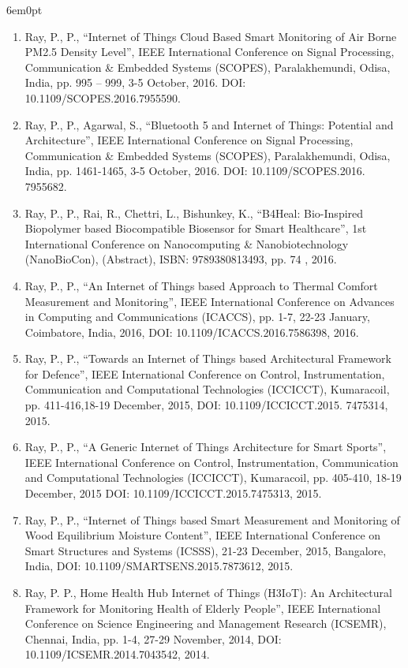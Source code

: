\documentclass[11pt,a4paper]{moderncv}
\begin{document}
\begin{adjustwidth}{6em}{0pt}
\begin{enumerate}
	\item Ray, P., P., “Internet of Things Cloud Based Smart Monitoring of Air Borne PM2.5 Density Level”, IEEE International Conference on Signal Processing, Communication \& Embedded Systems (SCOPES), Paralakhemundi, Odisa, India, pp. 995 – 999, 3-5 October, 2016. DOI: 10.1109/SCOPES.2016.7955590.
	
	\item Ray, P., P., Agarwal, S., “Bluetooth 5 and Internet of Things: Potential and Architecture”, IEEE International Conference on Signal Processing, Communication \& Embedded Systems (SCOPES), Paralakhemundi, Odisa, India, pp. 1461-1465, 3-5 October, 2016. DOI: 10.1109/SCOPES.2016. 7955682.
	
	\item Ray, P., P., Rai, R., Chettri, L., Bishunkey, K., “B4Heal: Bio-Inspired Biopolymer based Biocompatible Biosensor for Smart Healthcare”, 1st International Conference on Nanocomputing \& Nanobiotechnology (NanoBioCon), (Abstract), ISBN: 9789380813493, pp. 74 , 2016.
	
	\item Ray, P., P., “An Internet of Things based Approach to Thermal Comfort Measurement and Monitoring”, IEEE International Conference on Advances in Computing and Communications (ICACCS), pp. 1-7, 22-23 January, Coimbatore, India, 2016, DOI: 10.1109/ICACCS.2016.7586398, 2016.
	
	\item Ray, P., P., “Towards an Internet of Things based Architectural Framework for Defence”, IEEE International Conference on Control, Instrumentation, Communication and Computational Technologies (ICCICCT), Kumaracoil, pp. 411-416,18-19 December, 2015, DOI: 10.1109/ICCICCT.2015. 7475314, 2015.
	
	\item Ray, P., P., “A Generic Internet of Things Architecture for Smart Sports”, IEEE International Conference on Control, Instrumentation, Communication and Computational Technologies (ICCICCT), Kumaracoil, pp. 405-410, 18-19 December, 2015 DOI: 10.1109/ICCICCT.2015.7475313, 2015.
	
	\item Ray, P., P., “Internet of Things based Smart Measurement and Monitoring of Wood Equilibrium Moisture Content”, IEEE International Conference on Smart Structures and Systems (ICSSS), 21-23 December, 2015, Bangalore, India, DOI: 10.1109/SMARTSENS.2015.7873612, 2015.
	
	\item Ray, P. P., Home Health Hub Internet of Things (H3IoT): An Architectural Framework for Monitoring Health of Elderly People”, IEEE International Conference on Science Engineering and Management Research (ICSEMR), Chennai, India, pp. 1-4, 27-29 November, 2014, DOI: 10.1109/ICSEMR.2014.7043542, 2014.
	

\end{enumerate}
\end{adjustwidth}
\end{document}
